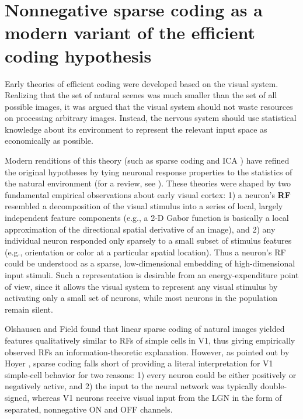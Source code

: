 \section{Nonnegative sparse coding as a modern variant of the efficient coding hypothesis}

Early theories of efficient coding
\citep{Barlow1961,Attneave1954}
were developed based on the visual system.
Realizing that the set of natural scenes was much smaller
than the set of all possible images,
it was argued that the visual system should not 
waste  resources on processing arbitrary images.
Instead, the nervous system should use statistical knowledge
about its environment to represent the relevant input space 
as economically as possible.

Modern renditions of this theory
(such as sparse coding \citep{OlshausenField1996} and
\ac{ICA} \citep{BellSejnowski1997})
have refined the original hypotheses
by tying neuronal response properties 
to the statistics of the natural environment
(for a review, see \cite{SimoncelliOlshausen2001}).
These theories were shaped by two
fundamental empirical observations
about early visual cortex:
1) a neuron's \textbf{\ac{RF}} resembled a decomposition of the visual
stimulus into a series of local, largely independent feature components
(e.g., a 2-D Gabor function is basically a local approximation of the
directional spatial derivative of an image),
and 2) any individual neuron responded only sparsely to a small subset of
stimulus features (e.g., orientation or color at a particular spatial location).
Thus a neuron's \ac{RF} could be understood as a
sparse, low-dimensional embedding of high-dimensional input stimuli.
Such a representation is desirable from an energy-expenditure point of view,
since it allows the visual system to represent
any visual stimulus by activating only a small set of neurons,
while most neurons in the population remain silent.

Olshausen and Field \citep{OlshausenField1996} found that
linear sparse coding of natural images
yielded features qualitatively similar to
\acp{RF} of simple cells in \ac{V1},
thus giving empirically observed \acp{RF} an information-theoretic explanation.
However, as pointed out by Hoyer \citep{Hoyer2003}, sparse coding falls short
of providing a literal interpretation for \ac{V1} simple-cell behavior
for two reasons:
1) every neuron could be either positively or negatively active, and
2) the input to the neural network was typically double-signed,
whereas \ac{V1} neurons receive visual input from the \ac{LGN} 
in the form of separated, nonnegative ON and OFF channels.

